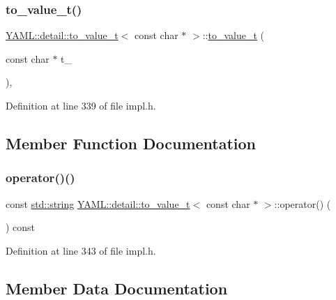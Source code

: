 \subsubsection{\texorpdfstring{to\_value\_t()}{to\_value\_t()}}
{\footnotesize\ttfamily \mbox{\hyperlink{struct_y_a_m_l_1_1detail_1_1to__value__t}{Y\+A\+M\+L\+::detail\+::to\+\_\+value\+\_\+t}}$<$ const char $\ast$ $>$\+::\mbox{\hyperlink{struct_y_a_m_l_1_1detail_1_1to__value__t}{to\+\_\+value\+\_\+t}} (\begin{DoxyParamCaption}\item[{const char $\ast$}]{t\+\_\+ }\end{DoxyParamCaption})\hspace{0.3cm}{\ttfamily [inline]}, {\ttfamily [explicit]}}



Definition at line 339 of file impl.\+h.



\subsection{Member Function Documentation}
\mbox{\label{struct_y_a_m_l_1_1detail_1_1to__value__t_3_01const_01char_01_5_01_4_a553beca888b7d6b29d90663e2cf42973}} 
\subsubsection{\texorpdfstring{operator()()}{operator()()}}
{\footnotesize\ttfamily const \mbox{\hyperlink{glad_8h_ac83513893df92266f79a515488701770}{std\+::string}} \mbox{\hyperlink{struct_y_a_m_l_1_1detail_1_1to__value__t}{Y\+A\+M\+L\+::detail\+::to\+\_\+value\+\_\+t}}$<$ const char $\ast$ $>$\+::operator() (\begin{DoxyParamCaption}{ }\end{DoxyParamCaption}) const\hspace{0.3cm}{\ttfamily [inline]}}



Definition at line 343 of file impl.\+h.



\subsection{Member Data Documentation}
\mbox{\label{struct_y_a_m_l_1_1detail_1_1to__value__t_3_01const_01char_01_5_01_4_a61e56c7ce67e2e7cec7321959aa67079}} 
